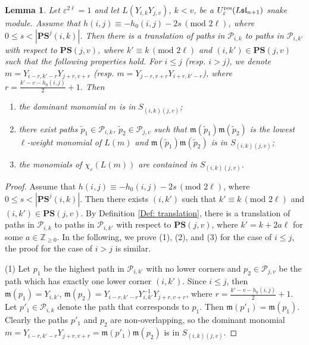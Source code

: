 \documentclass[12pt, reqno]{amsart}
\newtheorem{lemma}[theorem]{Lemma}
\numberwithin{equation}{section}
\newcommand{\ZZ}{\mathbb{Z}}
\newcommand{\res}{{\rm res}}
\begin{document}
{\begin{lemma}\label{Le: II translation of degree 2}
Let $\varepsilon^{2 \ell}=1$ and let $L(Y_{i,k}Y_{j,v})$, $k<v$, be a $U_{\varepsilon}^{\res}({L\mathfrak{sl}_{n+1}})$ snake module. Assume that $h(i,j)\equiv -h_{0}(i,j)-2s\,(\text{mod } 2 \ell)$, where $0\leq s<|\mathbf{PS}^{j}(i,k)|$. Then there is a translation of paths in $\mathscr{P}_{i,k}$ to paths in $\mathscr{P}_{i,k'}$ with respect to $\mathbf{PS}(j,v)$, where $k'\equiv k \, (\text{mod } 2 \ell)$ and $(i,k')\in \mathbf{PS}(j,v)$ such that the following properties hold.  For $i\leq j$ (resp. $i>j$), we denote $m=Y_{i-r,k'-r}Y_{j+r,v+r}$ (resp. $m=Y_{j-r,v+r}Y_{i+r,k'-r}$), where $r=\frac{k'-v-h_0(i,j)}2+1$. Then
\begin{enumerate}
    \item the dominant monomial $m$ is in $S_{(i,k)(j,v)}$;
    \item there exist paths $\widetilde{p}_1 \in \mathscr{P}_{i,k}$, $\widetilde{p}_2\in \mathscr{P}_{j,v}$ such that $\mathfrak{m}(\widetilde{p}_1)\mathfrak{m}(\widetilde{p}_2)$ is the lowest $\ell$-weight monomial of $L(m)$ and $\mathfrak{m}(\widetilde{p}_1)\mathfrak{m}(\widetilde{p}_2)$ is in $S_{(i,k)(j,v)}$;
    \item the monomials of $\chi_\varepsilon(L(m))$ are contained in $S_{(i,k)(j,v)}$.
\end{enumerate}
\end{lemma}

\begin{proof}
Assume that $h(i,j)\equiv -h_{0}(i,j)-2s\,(\text{mod } 2 \ell)$, where $0\leq s<|\mathbf{PS}^{j}(i,k)|$. Then there exists $(i,k')$ such that $k'\equiv k\,(\text{mod } 2 \ell)$ and $(i,k')\in \mathbf{PS}(j,v)$. By Definition \ref{Def: translation}, there is a translation of paths in $\mathscr{P}_{i,k}$ to paths in $\mathscr{P}_{i,k'}$ with respect to $\mathbf{PS}(j,v)$, where $k'=k+2a \ell$ for some $a\in \ZZ_{\geq 0}$. In the following, we prove (1), (2), and (3) for the case of $i\leq j$, the proof for the case of $i>j$ is similar.

(1) Let $p_1$ be the highest path in $\mathscr{P}_{i,k'}$ with no lower corners and $p_2 \in \mathscr{P}_{j,v}$ be the path which has exactly one lower corner $(i, k')$. Since $i\leq j$, then $\mathfrak{m}(p_1)=Y_{i,k'}$, $\mathfrak{m}(p_2)=Y_{i-r,k'-r}Y_{i,k'}^{-1}Y_{j+r,v+r}$, where $r=\frac{k'-v-h_0(i,j)}2+1$. Let $p'_1\in\mathscr{P}_{i,k}$ denote the path that corresponds to $p_1$. Then $\mathfrak{m}(p'_1)=\mathfrak{m}(p_1)$. Clearly the paths $p'_1$ and $p_2$ are non-overlapping, so the dominant monomial $m=Y_{i-r,k'-r}Y_{j+r,v+r}=\mathfrak{m}(p'_1)\mathfrak{m}(p_2)$ is in $S_{(i,k)(j,v)}$.


\end{proof}}
\end{document}
